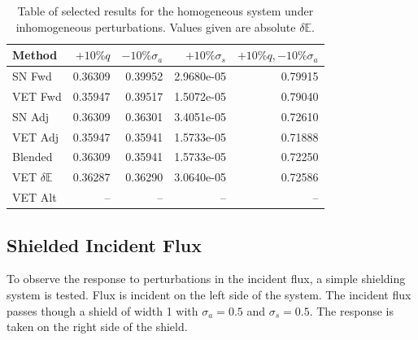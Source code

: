 \documentclass[12pt]{report}
\newcommand{\Edd}{\mathbb{E}}
\newcommand{\sigs}{\sigma_s}
\newcommand{\siga}{\sigma_a}
\begin{document}
\begin{table}[H]
\centering
  \begin{tabular}{| l | r | r | r | r |}
    \hline
    Method  &  $+10\% q $  & $-10\% \siga $ & $+10\% \sigs $ & $+10\% q,-10\% \siga$ \\ \hline
     SN Fwd 			&0.36309 &0.39952 &2.9680e-05 & 0.79915\\ \hline
     VET Fwd			&0.35947 &0.39517 &1.5072e-05 &0.79040\\ \hline
     SN Adj  			&0.36309 &0.36301 &3.4051e-05 &0.72610\\ \hline
     VET Adj 			&0.35947 &0.35941 &1.5733e-05 &0.71888\\ \hline
     Blended 			&0.36309 &0.35941 &1.5733e-05 &0.72250\\ \hline
     VET $\delta \Edd$ 	&0.36287 &0.36290 &3.0640e-05 &0.72586\\ \hline
     VET Alt			& --  & --  &	--		&  --\\ \hline
    \end{tabular}
  \caption{Table of selected results for the homogeneous system under inhomogeneous perturbations. Values given are absolute $\delta \Edd$. }
\end{table}

\subsection{Shielded Incident Flux}
To observe the response to perturbations in the incident flux, a simple shielding system is tested. Flux is incident on the left side of the system. The incident flux passes though a shield of width 1 with $\siga=0.5$ and $\sigs=0.5$. The response is taken on the right side of the shield.
\end{document}
